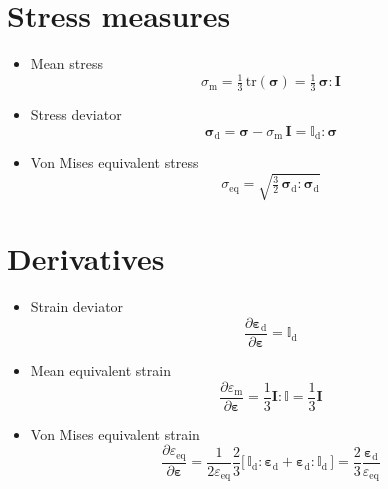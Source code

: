 \documentclass[times,namecite]{goose-article}
\begin{document}
\section{Stress measures}
\label{sec:stress}

\begin{itemize}
%
\item Mean stress
%
\begin{equation}
\sigma_\mathrm{m}
= \tfrac{1}{3} \, \mathrm{tr} ( \bm{\sigma} )
= \tfrac{1}{3} \, \bm{\sigma} : \bm{I}
\end{equation}
%
\item Stress deviator
%
\begin{equation}
  \bm{\sigma}_\mathrm{d}
  = \bm{\sigma} - \sigma_\mathrm{m} \, \bm{I}
  = \mathbb{I}_\mathrm{d} : \bm{\sigma}
\end{equation}
%
\item Von Mises equivalent stress
\begin{equation}
\sigma_\mathrm{eq} = \sqrt{ \tfrac{3}{2} \, \bm{\sigma}_\mathrm{d} : \bm{\sigma}_\mathrm{d} }
\end{equation}
%
\end{itemize}

\section{Derivatives}
\label{sec:derivatives}

\begin{itemize}
%
\item Strain deviator
\begin{equation}
  \frac{ \partial \bm{\varepsilon}_\mathrm{d} }{ \partial \bm{\varepsilon} }
  = \mathbb{I}_\mathrm{d}
\end{equation}
%
\item Mean equivalent strain
\begin{equation}
  \frac{ \partial \varepsilon_\mathrm{m} }{ \partial \bm{\varepsilon} }
  =
  \frac{1}{3} \bm{I} : \mathbb{I}
  =
  \frac{1}{3} \bm{I}
\end{equation}
%
\item Von Mises equivalent strain
\begin{equation}
  \frac{ \partial \varepsilon_\mathrm{eq} }{ \partial \bm{\varepsilon} }
  =
  \frac{1}{2 \varepsilon_\mathrm{eq}} \frac{2}{3}
  \big[\, \mathbb{I}_\mathrm{d} : \bm{\varepsilon}_\mathrm{d} + \bm{\varepsilon}_\mathrm{d} : \mathbb{I}_\mathrm{d} \,\big]
  =
  \frac{2}{3} \frac{\bm{\varepsilon}_\mathrm{d}}{\varepsilon_\mathrm{eq}}
\end{equation}
%
\end{itemize}


\end{document}
